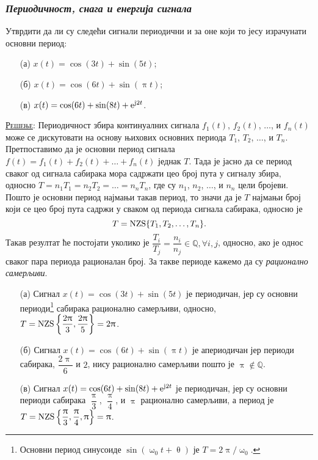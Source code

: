 \subsubsection{\textit{Периодичност, снага и енергија сигнала}}
\PID 
\noindent 
Утврдити да ли су следећи сигнали периодични и за оне који то јесу израчунати 
основни период:
\begin{multicols}{2}
\begin{enumerate}
\item[(а)] $x(t) = \cos(3t) + \sin(5t)$;
\item[(б)] $x(t) = \cos(6t) + \sin(\uppi t)$;
\item[(в)] $x(t) = \cos(6t) + \sin(8t) + {\rm e}^{{\rm j}2t}$.
\end{enumerate}
\end{multicols}

\textsc{\underline{Решење}}:
Периодичност збира континуалних сигнала $f_1(t)$, $f_2(t)$, $\ldots$, и $f_n(t)$ може се дискутовати на основу њихових основних 
периода $T_1$, $T_2$, $\ldots$, и $T_n$. Претпоставимо да је основни период сигнала 
$f(t) = f_1(t) + f_2(t) + \ldots + f_n(t)$ једнак $T$. Тада је јасно да се период сваког од сигнала сабирака 
мора садржати цео број пута у сигналу збира, односно $T = n_1T_1 = n_2T_2 = \ldots = n_nT_n$, где су $n_1$, $n_2$, $\ldots$, и $n_n$ 
цели бројеви. Пошто је основни период најмањи такав период, то значи да је $T$ најмањи број који се цео број пута 
садржи у сваком од периода сигнала сабирака, односно је
\begin{equation}
    T = {\rm NZS} \{ T_1, T_2, \ldots, T_n\}.
    \label{eq:nzs}
\end{equation}
Такав резултат ће постојати уколико је $\dfrac{T_i}{T_j} = \dfrac{n_i}{n_j} \in \mathbb Q, \forall i,j$,
односно, ако је однос сваког пара периода рационалан број.    
За такве периоде кажемо да су \textit{рационално самерљиви}.

\begin{enumerate}
    \item[(а)] Сигнал $x(t) = \cos(3t) + \sin(5t)$ је периодичан, јер су основни периоди\footnote{
    Основни период синусоиде $\sin(\upomega_0 t + \uptheta)$ је $T = 2\uppi /\upomega_0$.
    } сабирака рационално самерљиви, односно,  
    $T = {\rm NZS} \left\{ \dfrac{2\uppi}{3}, \dfrac{2\uppi}{5} \right\} = {2\uppi}$. 
    \item[(б)] Сигнал $x(t) = \cos(6t) + \sin(\uppi t)$ је 
    апериодичан јер периоди сабирака, $\dfrac{2\uppi}{6}$ и $2$, нису рационално самерљиви пошто је 
    $\uppi \not\in \mathbb Q$.
    \item [(в)] Сигнал $x(t) = \cos(6t) + \sin(8t) + {\rm e}^{{\rm j}2t}$ је периодичан, 
    јер су основни периоди сабирака
    $\dfrac{\uppi}{3}$, $\dfrac{\uppi}{4}$, и $\uppi$ рационално самерљиви, а период
    је $T = {\rm NZS} \left\{ \dfrac{\uppi}{3}, \dfrac{\uppi}{4}, \uppi \right\} = \uppi$.
\end{enumerate}
